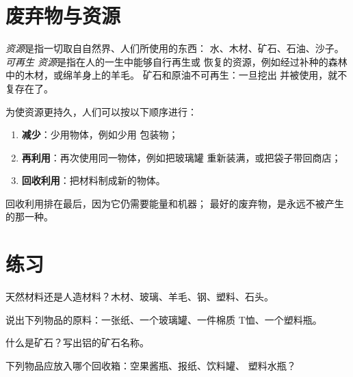 \section{废弃物与资源}

\begin{definition}[资源]\label{def:g5:raw-materials-and-recycling:resource}
\emph{资源}是指一切取自自然界、人们所使用的东西：
水、木材、矿石、石油、沙子。\emph{可再生
资源}是指在人的一生中能够自行再生或
恢复的资源，例如经过补种的森林中的木材，或绵羊身上的羊毛。
矿石和原油不可再生：一旦挖出
并被使用，就不复存在了。
\end{definition}

\begin{proposition}\label{prop:g5:raw-materials-and-recycling:three}
为使资源更持久，人们可以按以下顺序进行：
\begin{enumerate}
  \item \textbf{减少}：少用物体，例如少用
        包装物；
  \item \textbf{再利用}：再次使用同一物体，例如把玻璃罐
        重新装满，或把袋子带回商店；
  \item \textbf{回收利用}：把材料制成新的物体。
\end{enumerate}
回收利用排在最后，因为它仍需要能量和机器；
最好的废弃物，是永远不被产生的那一种。
\end{proposition}

\section{练习}

\begin{exercise}[$\star$]\label{exo:g5:raw-materials-and-recycling:1}
天然材料还是人造材料？木材、玻璃、羊毛、钢、塑料、石头。
\end{exercise}

\begin{exercise}[$\star$]\label{exo:g5:raw-materials-and-recycling:2}
说出下列物品的原料：一张纸、一个玻璃罐、一件棉质
T恤、一个塑料瓶。
\end{exercise}

\begin{exercise}[$\star$]\label{exo:g5:raw-materials-and-recycling:3}
什么是矿石？写出铝的矿石名称。
\end{exercise}

\begin{exercise}[$\star$]\label{exo:g5:raw-materials-and-recycling:4}
下列物品应放入哪个回收箱：空果酱瓶、报纸、饮料罐、
塑料水瓶？
\end{exercise}

